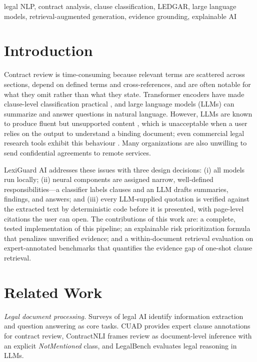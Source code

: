 \documentclass[conference]{IEEEtran}
\begin{document}
\begin{IEEEkeywords}
legal NLP, contract analysis, clause classification, LEDGAR, large language models, retrieval-augmented generation, evidence grounding, explainable AI
\end{IEEEkeywords}

\section{Introduction}
Contract review is time-consuming because relevant terms are scattered across sections, depend on defined terms and cross-references, and are often notable for what they omit rather than what they state. Transformer encoders \cite{vaswani2017,devlin2019} have made clause-level classification practical \cite{tuggener2020,chalkidis2022}, and large language models (LLMs) can summarize and answer questions in natural language. However, LLMs are known to produce fluent but unsupported content \cite{ji2023}, which is unacceptable when a user relies on the output to understand a binding document; even commercial legal research tools exhibit this behaviour \cite{magesh2024}. Many organizations are also unwilling to send confidential agreements to remote services.

LexiGuard AI addresses these issues with three design decisions: (i) all models run locally; (ii) neural components are assigned narrow, well-defined responsibilities---a classifier labels clauses and an LLM drafts summaries, findings, and answers; and (iii) every LLM-supplied quotation is verified against the extracted text by deterministic code before it is presented, with page-level citations the user can open. The contributions of this work are: a complete, tested implementation of this pipeline; an explainable risk prioritization formula that penalizes unverified evidence; and a within-document retrieval evaluation on expert-annotated benchmarks that quantifies the evidence gap of one-shot clause retrieval.

\section{Related Work}
\textit{Legal document processing.} Surveys of legal AI \cite{zhong2020} identify information extraction and question answering as core tasks. CUAD \cite{hendrycks2021} provides expert clause annotations for contract review, ContractNLI \cite{koreeda2021} frames review as document-level inference with an explicit \emph{NotMentioned} class, and LegalBench \cite{guha2023} evaluates legal reasoning in LLMs.
\end{document}
